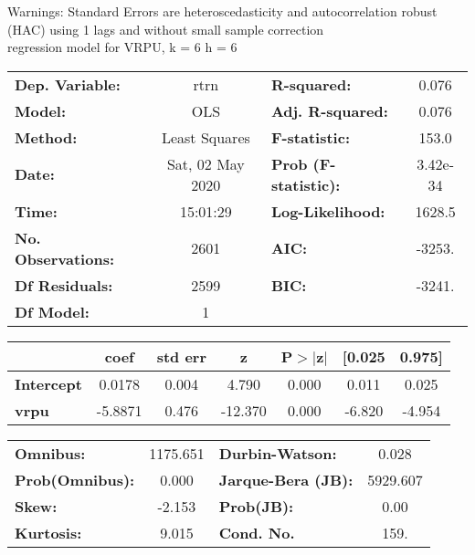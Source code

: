 Warnings: \newline
 [1] Standard Errors are heteroscedasticity and autocorrelation robust (HAC) using 1 lags and without small sample correction\\ 

regression model for VRPU, k = 6 h = 6\begin{center}
\begin{tabular}{lclc}
\toprule
\textbf{Dep. Variable:}    &       rtrn       & \textbf{  R-squared:         } &     0.076   \\
\textbf{Model:}            &       OLS        & \textbf{  Adj. R-squared:    } &     0.076   \\
\textbf{Method:}           &  Least Squares   & \textbf{  F-statistic:       } &     153.0   \\
\textbf{Date:}             & Sat, 02 May 2020 & \textbf{  Prob (F-statistic):} &  3.42e-34   \\
\textbf{Time:}             &     15:01:29     & \textbf{  Log-Likelihood:    } &    1628.5   \\
\textbf{No. Observations:} &        2601      & \textbf{  AIC:               } &    -3253.   \\
\textbf{Df Residuals:}     &        2599      & \textbf{  BIC:               } &    -3241.   \\
\textbf{Df Model:}         &           1      & \textbf{                     } &             \\
\bottomrule
\end{tabular}
\begin{tabular}{lcccccc}
                   & \textbf{coef} & \textbf{std err} & \textbf{z} & \textbf{P$> |$z$|$} & \textbf{[0.025} & \textbf{0.975]}  \\
\midrule
\textbf{Intercept} &       0.0178  &        0.004     &     4.790  &         0.000        &        0.011    &        0.025     \\
\textbf{vrpu}      &      -5.8871  &        0.476     &   -12.370  &         0.000        &       -6.820    &       -4.954     \\
\bottomrule
\end{tabular}
\begin{tabular}{lclc}
\textbf{Omnibus:}       & 1175.651 & \textbf{  Durbin-Watson:     } &    0.028  \\
\textbf{Prob(Omnibus):} &   0.000  & \textbf{  Jarque-Bera (JB):  } & 5929.607  \\
\textbf{Skew:}          &  -2.153  & \textbf{  Prob(JB):          } &     0.00  \\
\textbf{Kurtosis:}      &   9.015  & \textbf{  Cond. No.          } &     159.  \\
\bottomrule
\end{tabular}
\end{center}

